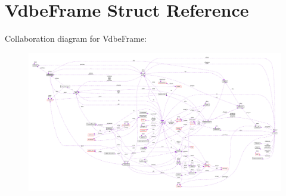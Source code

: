 \hypertarget{structVdbeFrame}{}\section{Vdbe\+Frame Struct Reference}
\label{structVdbeFrame}


Collaboration diagram for Vdbe\+Frame\+:\nopagebreak
\begin{figure}[H]
\begin{center}
\leavevmode
\includegraphics[width=350pt]{structVdbeFrame__coll__graph}
\end{center}
\end{figure}
